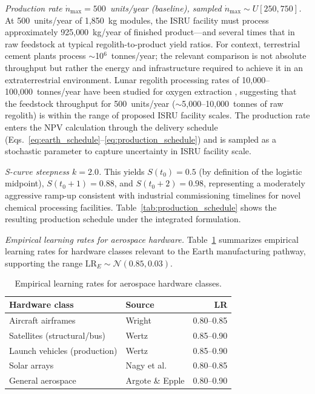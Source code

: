 \documentclass[preprint,12pt]{elsarticle}
\begin{document}
\emph{Production rate $\dot{n}_{\max} = 500$~units/year (baseline), sampled $\dot{n}_{\max} \sim U[250, 750]$.} At 500~units/year of 1{,}850~kg modules, the ISRU facility must process approximately 925{,}000~kg/year of finished product---and several times that in raw feedstock at typical regolith-to-product yield ratios. For context, terrestrial cement plants process $\sim$10$^6$~tonnes/year; the relevant comparison is not absolute throughput but rather the energy and infrastructure required to achieve it in an extraterrestrial environment. Lunar regolith processing rates of 10{,}000--100{,}000~tonnes/year have been studied for oxygen extraction \cite{sanders2015}, suggesting that the feedstock throughput for 500~units/year ($\sim$5{,}000--10{,}000~tonnes of raw regolith) is within the range of proposed ISRU facility scales. The production rate enters the NPV calculation through the delivery schedule (Eqs.~\ref{eq:earth_schedule}--\ref{eq:production_schedule}) and is sampled as a stochastic parameter to capture uncertainty in ISRU facility scale.

\emph{S-curve steepness $k = 2.0$.} This yields $S(t_0) = 0.5$ (by definition of the logistic midpoint), $S(t_0 + 1) = 0.88$, and $S(t_0 + 2) = 0.98$, representing a moderately aggressive ramp-up consistent with industrial commissioning timelines for novel chemical processing facilities. Table~\ref{tab:production_schedule} shows the resulting production schedule under the integrated formulation.

\emph{Empirical learning rates for aerospace hardware.} Table~\ref{tab:learning_rates} summarizes empirical learning rates for hardware classes relevant to the Earth manufacturing pathway, supporting the range $\mathrm{LR}_E \sim \mathcal{N}(0.85, 0.03)$.

\begin{table}[htbp]
\centering
\caption{Empirical learning rates for aerospace hardware classes.}
\label{tab:learning_rates}
\small
\begin{tabular}{@{}llr@{}}
\toprule
Hardware class & Source & LR \\
\midrule
Aircraft airframes & Wright \cite{wright1936} & 0.80--0.85 \\
Satellites (structural/bus) & Wertz \cite{wertz2011} & 0.85--0.90 \\
Launch vehicles (production) & Wertz \cite{wertz2011} & 0.85--0.90 \\
Solar arrays & Nagy et al.\ \cite{nagy2013} & 0.80--0.85 \\
General aerospace & Argote \& Epple \cite{argote1990} & 0.80--0.90 \\
\bottomrule
\end{tabular}
\end{table}
\end{document}
